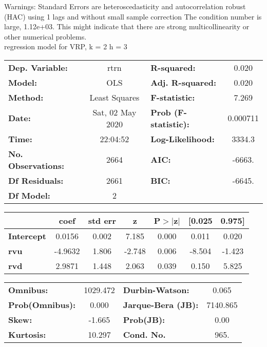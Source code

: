 Warnings: \newline
 [1] Standard Errors are heteroscedasticity and autocorrelation robust (HAC) using 1 lags and without small sample correction \newline
 [2] The condition number is large, 1.12e+03. This might indicate that there are \newline
 strong multicollinearity or other numerical problems.\\ 

regression model for VRP, k = 2 h = 3\begin{center}
\begin{tabular}{lclc}
\toprule
\textbf{Dep. Variable:}    &       rtrn       & \textbf{  R-squared:         } &     0.020   \\
\textbf{Model:}            &       OLS        & \textbf{  Adj. R-squared:    } &     0.020   \\
\textbf{Method:}           &  Least Squares   & \textbf{  F-statistic:       } &     7.269   \\
\textbf{Date:}             & Sat, 02 May 2020 & \textbf{  Prob (F-statistic):} &  0.000711   \\
\textbf{Time:}             &     22:04:52     & \textbf{  Log-Likelihood:    } &    3334.3   \\
\textbf{No. Observations:} &        2664      & \textbf{  AIC:               } &    -6663.   \\
\textbf{Df Residuals:}     &        2661      & \textbf{  BIC:               } &    -6645.   \\
\textbf{Df Model:}         &           2      & \textbf{                     } &             \\
\bottomrule
\end{tabular}
\begin{tabular}{lcccccc}
                   & \textbf{coef} & \textbf{std err} & \textbf{z} & \textbf{P$> |$z$|$} & \textbf{[0.025} & \textbf{0.975]}  \\
\midrule
\textbf{Intercept} &       0.0156  &        0.002     &     7.185  &         0.000        &        0.011    &        0.020     \\
\textbf{rvu}       &      -4.9632  &        1.806     &    -2.748  &         0.006        &       -8.504    &       -1.423     \\
\textbf{rvd}       &       2.9871  &        1.448     &     2.063  &         0.039        &        0.150    &        5.825     \\
\bottomrule
\end{tabular}
\begin{tabular}{lclc}
\textbf{Omnibus:}       & 1029.472 & \textbf{  Durbin-Watson:     } &    0.065  \\
\textbf{Prob(Omnibus):} &   0.000  & \textbf{  Jarque-Bera (JB):  } & 7140.865  \\
\textbf{Skew:}          &  -1.665  & \textbf{  Prob(JB):          } &     0.00  \\
\textbf{Kurtosis:}      &  10.297  & \textbf{  Cond. No.          } &     965.  \\
\bottomrule
\end{tabular}
\end{center}

